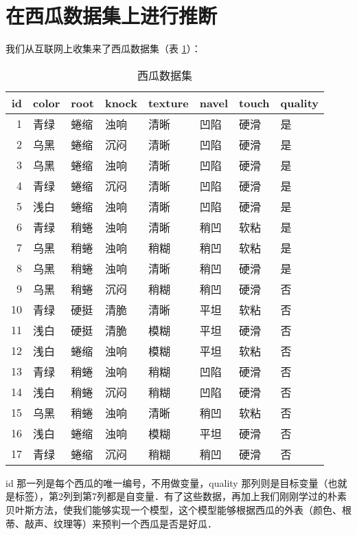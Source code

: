 \documentclass{ctexart}
\begin{document}
    \section{在西瓜数据集上进行推断}
    我们从互联网上收集来了西瓜数据集（表 \ref{tab:watermelon-1}）：
    \begin{table}[H]
        \begin{center}
            \caption{西瓜数据集}
            \label{tab:watermelon-1}
            \begin{tabular}{rlllllll}
                \toprule
              id & color & root & knock & texture & navel & touch & quality \\
                \midrule
                1 & 青绿 & 蜷缩 & 浊响 & 清晰 & 凹陷 & 硬滑 & 是 \\
                2 & 乌黑 & 蜷缩 & 沉闷 & 清晰 & 凹陷 & 硬滑 & 是 \\
                3 & 乌黑 & 蜷缩 & 浊响 & 清晰 & 凹陷 & 硬滑 & 是 \\
                4 & 青绿 & 蜷缩 & 沉闷 & 清晰 & 凹陷 & 硬滑 & 是 \\
                5 & 浅白 & 蜷缩 & 浊响 & 清晰 & 凹陷 & 硬滑 & 是 \\
                6 & 青绿 & 稍蜷 & 浊响 & 清晰 & 稍凹 & 软粘 & 是 \\
                7 & 乌黑 & 稍蜷 & 浊响 & 稍糊 & 稍凹 & 软粘 & 是 \\
                8 & 乌黑 & 稍蜷 & 浊响 & 清晰 & 稍凹 & 硬滑 & 是 \\
                9 & 乌黑 & 稍蜷 & 沉闷 & 稍糊 & 稍凹 & 硬滑 & 否 \\
            10 & 青绿 & 硬挺 & 清脆 & 清晰 & 平坦 & 软粘 & 否 \\
            11 & 浅白 & 硬挺 & 清脆 & 模糊 & 平坦 & 硬滑 & 否 \\
            12 & 浅白 & 蜷缩 & 浊响 & 模糊 & 平坦 & 软粘 & 否 \\
            13 & 青绿 & 稍蜷 & 浊响 & 稍糊 & 凹陷 & 硬滑 & 否 \\
            14 & 浅白 & 稍蜷 & 沉闷 & 稍糊 & 凹陷 & 硬滑 & 否 \\
            15 & 乌黑 & 稍蜷 & 浊响 & 清晰 & 稍凹 & 软粘 & 否 \\
            16 & 浅白 & 蜷缩 & 浊响 & 模糊 & 平坦 & 硬滑 & 否 \\
            17 & 青绿 & 蜷缩 & 沉闷 & 稍糊 & 稍凹 & 硬滑 & 否 \\
                \bottomrule
              \end{tabular}
        \end{center}
    \end{table}

    id 那一列是每个西瓜的唯一编号，不用做变量，quality 那列则是目标变量（也就是标签），第2列到第7列都是自变量．有了这些数据，再加上我们刚刚学过的朴素贝叶斯方法，使我们能够实现一个模型，这个模型能够根据西瓜的外表（颜色、根蒂、敲声、纹理等）来预判一个西瓜是否是好瓜．
\end{document}
